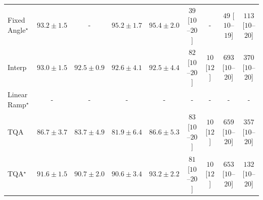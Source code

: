 \begin{tabular}{l|cccc|cccc|}
Fixed Angle$^\star$ & {\cellcolor[HTML]{034B76}} \color[HTML]{F1F1F1} $93.2\pm 1.5$ & {\cellcolor[HTML]{000000}} \color[HTML]{F1F1F1} {\cellcolor{white}} \color{black} - & {\cellcolor[HTML]{02395A}} \color[HTML]{F1F1F1} $95.2\pm 1.7$ & {\cellcolor[HTML]{023858}} \color[HTML]{F1F1F1} $95.4\pm 2.0$ & {\cellcolor[HTML]{FEEEEA}} \color[HTML]{000000} $39$ [$10$--$20$] & {\cellcolor[HTML]{000000}} \color[HTML]{F1F1F1} {\cellcolor{white}} \color{black} - & {\cellcolor[HTML]{FEEBE7}} \color[HTML]{000000} $49$ [$10$--$19$] & {\cellcolor[HTML]{FDD8D5}} \color[HTML]{000000} $113$ [$10$--$20$] \\
Interp & {\cellcolor[HTML]{034C78}} \color[HTML]{F1F1F1} $93.0\pm 1.5$ & {\cellcolor[HTML]{045280}} \color[HTML]{F1F1F1} $92.5\pm 0.9$ & {\cellcolor[HTML]{03517E}} \color[HTML]{F1F1F1} $92.6\pm 4.1$ & {\cellcolor[HTML]{045280}} \color[HTML]{F1F1F1} $92.5\pm 4.4$ & {\cellcolor[HTML]{FDE2DF}} \color[HTML]{000000} $82$ [$10$--$20$] & {\cellcolor[HTML]{FFF5F1}} \color[HTML]{000000} $10$ [$12$] & {\cellcolor[HTML]{4C006B}} \color[HTML]{F1F1F1} $693$ [$10$--$20$] & {\cellcolor[HTML]{F15C9F}} \color[HTML]{F1F1F1} $370$ [$10$--$20$] \\
Linear Ramp$^\star$ & {\cellcolor[HTML]{000000}} \color[HTML]{F1F1F1} {\cellcolor{white}} \color{black} - & {\cellcolor[HTML]{000000}} \color[HTML]{F1F1F1} {\cellcolor{white}} \color{black} - & {\cellcolor[HTML]{000000}} \color[HTML]{F1F1F1} {\cellcolor{white}} \color{black} - & {\cellcolor[HTML]{000000}} \color[HTML]{F1F1F1} {\cellcolor{white}} \color{black} - & {\cellcolor[HTML]{000000}} \color[HTML]{F1F1F1} {\cellcolor{white}} \color{black} - & {\cellcolor[HTML]{000000}} \color[HTML]{F1F1F1} {\cellcolor{white}} \color{black} - & {\cellcolor[HTML]{000000}} \color[HTML]{F1F1F1} {\cellcolor{white}} \color{black} - & {\cellcolor[HTML]{000000}} \color[HTML]{F1F1F1} {\cellcolor{white}} \color{black} - \\
TQA & {\cellcolor[HTML]{1278B4}} \color[HTML]{F1F1F1} $86.7\pm 3.7$ & {\cellcolor[HTML]{3790C0}} \color[HTML]{F1F1F1} $83.7\pm 4.9$ & {\cellcolor[HTML]{549CC7}} \color[HTML]{F1F1F1} $81.9\pm 6.4$ & {\cellcolor[HTML]{1278B4}} \color[HTML]{F1F1F1} $86.6\pm 5.3$ & {\cellcolor[HTML]{FDE1DE}} \color[HTML]{000000} $83$ [$10$--$20$] & {\cellcolor[HTML]{FFF5F1}} \color[HTML]{000000} $10$ [$12$] & {\cellcolor[HTML]{5F0070}} \color[HTML]{F1F1F1} $659$ [$10$--$20$] & {\cellcolor[HTML]{F564A0}} \color[HTML]{F1F1F1} $357$ [$10$--$20$] \\
TQA$^\star$ & {\cellcolor[HTML]{04598C}} \color[HTML]{F1F1F1} $91.6\pm 1.5$ & {\cellcolor[HTML]{045E94}} \color[HTML]{F1F1F1} $90.7\pm 2.0$ & {\cellcolor[HTML]{045F95}} \color[HTML]{F1F1F1} $90.6\pm 3.4$ & {\cellcolor[HTML]{034B76}} \color[HTML]{F1F1F1} $93.2\pm 2.2$ & {\cellcolor[HTML]{FDE2DF}} \color[HTML]{000000} $81$ [$10$--$20$] & {\cellcolor[HTML]{FFF5F1}} \color[HTML]{000000} $10$ [$12$] & {\cellcolor[HTML]{620171}} \color[HTML]{F1F1F1} $653$ [$10$--$20$] & {\cellcolor[HTML]{FCD2CE}} \color[HTML]{000000} $132$ [$10$--$20$] \\

\end{tabular}
